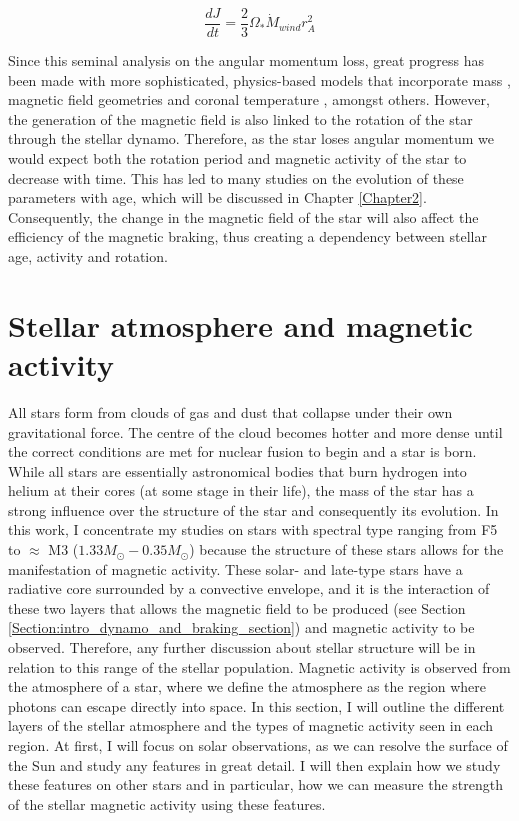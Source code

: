 \begin{equation}
    \frac{dJ}{dt} = \frac{2}{3}\Omega_{*}\dot{M}_{wind}r_{A}^{2}
    \label{Eq:WD67_mag_braking}
\end{equation}

Since this seminal analysis on the angular momentum loss, great progress has been made with more sophisticated, physics-based models that incorporate mass \citep{Matt_etal_2015}, magnetic field geometries \citep{Finley_etal_2017,Garraffo_etal_2018} and coronal temperature \citep{Pantolmos_etal_2017}, amongst others. However, the generation of the magnetic field is also linked to the rotation of the star through the stellar dynamo. Therefore, as the star loses angular momentum we would expect both the rotation period and magnetic activity of the star to decrease with time. This has led to many studies on the evolution of these parameters with age, which will be discussed in Chapter \ref{Chapter2}. Consequently, the change in the magnetic field of the star will also affect the efficiency of the magnetic braking, thus creating a dependency between  stellar age, activity and rotation.

\section{Stellar atmosphere and magnetic activity}
\label{Section:intro_stellar_structure}

All stars form from clouds of gas and dust that collapse under their own gravitational force. The centre of the cloud becomes hotter and more dense until the correct conditions are met for nuclear fusion to begin and a star is born. While all stars are essentially astronomical bodies that burn hydrogen into helium at their cores (at some stage in their life), the mass of the star has a strong influence over the structure of the star and consequently its evolution. In this work, I concentrate my studies on stars with spectral type ranging from F5 to $\approx$ M3 ($1.33 M_{\odot} - 0.35 M_{\odot}$) because the structure of these stars allows for the manifestation of magnetic activity. These solar- and late-type stars have a radiative core surrounded by a convective envelope, and it is the interaction of these two layers that allows the magnetic field to be produced (see Section \ref{Section:intro_dynamo_and_braking_section}) and magnetic activity to be observed. Therefore, any further discussion about stellar structure will be in relation to this range of the stellar population. Magnetic activity is observed from the atmosphere of a star, where we define the atmosphere as the region where photons can escape directly into space. In this section, I will outline the different layers of the stellar atmosphere and the types of magnetic activity seen in each region. At first, I will focus on solar observations, as we can resolve the surface of the Sun and study any features in great detail. I will then explain how we study these features on other stars and in particular, how we can measure the strength of the stellar magnetic activity using these features.

